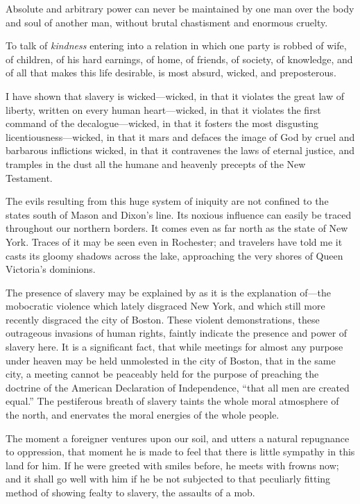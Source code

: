 Absolute and arbitrary power can never be maintained by one man over the
body and soul of another man, without brutal chastisment and enormous
cruelty.

To talk of \emph{kindness} entering into a relation in which one party
is robbed of wife, of children, of his hard earnings, of home, of
friends, of society, of knowledge, and of all that makes this life
desirable, is most absurd, wicked, and preposterous.

I have shown that slavery is wicked---wicked, in that it violates {}the
great law of liberty, written on every human heart---wicked, in that it
violates the first command of the decalogue---wicked, in that it fosters
the most disgusting licentiousness---wicked, in that it mars and defaces
the image of God by cruel and barbarous inflictions wicked, in that it
contravenes the laws of eternal justice, and tramples in the dust all
the humane and heavenly precepts of the New Testament.

The evils resulting from this huge system of iniquity are not confined
to the states south of Mason and Dixon's line. Its noxious influence can
easily be traced throughout our northern borders. It comes even as far
north as the state of New York. Traces of it may be seen even in
Rochester; and travelers have told me it casts its gloomy shadows across
the lake, approaching the very shores of Queen Victoria's dominions.

The presence of slavery may be explained by as it is the explanation
of---the mobocratic violence which lately disgraced New York, and which
still more recently disgraced the city of Boston. These violent
demonstrations, these outrageous invasions of human rights, faintly
indicate the presence and power of slavery here. It is a significant
fact, that while meetings for almost any purpose under heaven may be
held unmolested in the city of Boston, that in the same city, a meeting
cannot be peaceably held for the purpose of preaching the doctrine of
the American Declaration of Independence, ``that all men are created
equal.'' The pestiferous breath of slavery taints the whole moral
atmosphere of the north, and enervates the moral energies of the whole
people.

The moment a foreigner ventures upon our soil, and utters a natural
repugnance to oppression, that moment he is made to feel that there is
little sympathy in this land for him. If he were greeted with smiles
before, he meets with frowns now; and it shall go well with him if he be
not subjected to that peculiarly fitting method of showing fealty to
slavery, the assaults of a mob.

